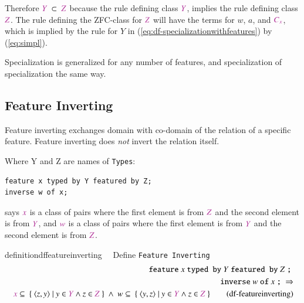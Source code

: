 \pn Therefore $\mc{Y}~\subset~\mc{Z}$ because the rule defining class $\mc{Y}$, implies the rule defining class $\mc{Z}$.
The rule defining the ZFC-class for $\mc{Z}$ will have the terms for $w$, $a$, and $\mc{C_x}$, which is implied by the rule for $Y$ in (\ref{eq:df-specializationwithfeatures}) by (\ref{eq:simpl}).  

\pn Specialization is generalized for any number of features, and specialization of specialization the same way.

\subsection{Feature Inverting}  

\pn Feature inverting exchanges domain with co-domain of the relation of a specific feature.
Feature inverting does \emph{not} invert the relation itself.

\pn Where Y and Z are names of \texttt{Types}:
\begin{lstlisting}
feature x typed by Y featured by Z;
inverse w of x;
\end{lstlisting}
says $\mc{x}$ is a class of pairs where the first element is from $\mc{Z}$ and the second element is from $\mc{Y}$, and $\mc{w}$ is a class of pairs where the first element is from $\mc{Y}$ and the second element is from $\mc{Z}$.


\begin{restatable}{definition}{dffeatureinverting}~~   Define \texttt{Feature Inverting}
\begin{align}
\texttt{feature}~x~\texttt{typed by}~ Y ~\texttt{featured by}~ Z~\texttt{;}~\notag \\ 
\texttt{inverse}~ w ~\texttt{of} ~x~\texttt{;}~\Rightarrow  \notag \\
~\mc{x} \subseteq~\{~\langle z,y\rangle~\vert~y \in \mc{Y} \wedge z \in \mc{Z}~\}~\wedge~w \subseteq~\{~\langle y,z\rangle~\vert~y \in \mc{Y} \wedge z \in \mc{Z}~\}
\label{eq:df-featureinverting}\tag{df-featureinverting}
\end{align}
\end{restatable}

